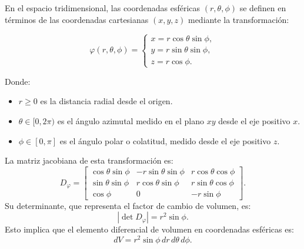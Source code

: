     \begin{definición}
    En el espacio tridimensional, las coordenadas esféricas $(r, \theta, \phi)$ se definen en términos de las coordenadas cartesianas $(x, y, z)$ mediante la transformación:\\
    
    \begin{minipage}{0.5\textwidth}
        \[
            \varphi(r, \theta, \phi) =
            \begin{cases}
                x = r\cos\theta \sin\phi, \\
                y = r\sin\theta \sin\phi, \\
                z = r\cos\phi.
            \end{cases}
        \]
    \end{minipage}
    \begin{minipage}{0.5\textwidth}
        \centering
        
    \end{minipage}
    
    Donde:
    \begin{itemize}
        \item $r \geq 0$ es la distancia radial desde el origen.
        \item $\theta \in [0, 2\pi)$ es el ángulo azimutal medido en el plano $xy$ desde el eje positivo $x$.
        \item $\phi \in [0, \pi]$ es el ángulo polar o colatitud, medido desde el eje positivo $z$.
    \end{itemize}
    
    La matriz jacobiana de esta transformación es: $$ D_\varphi =
        \begin{bmatrix}
            \cos\theta \sin\phi & -r\sin\theta \sin\phi & r\cos\theta \cos\phi \\
            \sin\theta \sin\phi & r\cos\theta \sin\phi  & r\sin\theta \cos\phi \\
            \cos\phi            & 0                     & -r\sin\phi
        \end{bmatrix}.
    $$
    Su determinante, que representa el factor de cambio de volumen, es:
    $$
        \left| \det D_\varphi \right| = r^2 \sin\phi.
    $$
    Esto implica que el elemento diferencial de volumen en coordenadas esféricas es:
    $$
        dV = r^2 \sin\phi \, dr \, d\theta \, d\phi.
    $$
    \end{definición}
    
